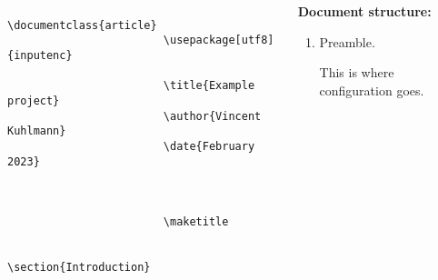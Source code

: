 \copyrightVincent

\begin{frame}[fragile]
    \begin{columns}
        \begin{column}{0.4\textwidth}
            \begin{adjustbox}{frame=1pt 5pt,valign=t}%
                \begin{minipage}{\textwidth}%
                    \begin{verbatim} 
                        \documentclass{article}
                        \usepackage[utf8]{inputenc}

                        \title{Example project}
                        \author{Vincent Kuhlmann}
                        \date{February 2023}

                        

                        \maketitle

                        \section{Introduction}

                        
                    \end{verbatim}
                \end{minipage}
            \end{adjustbox}
        \end{column}
        \begin{column}{0.6\textwidth}
            {\large\textbf{Document structure:}}

            \begin{enumerate}[label=\textbullet]
                \item {}\; Preamble. 

                This is where configuration goes.


\end{enumerate}
\end{column}
\end{columns}
\end{frame}
